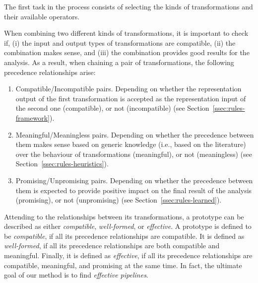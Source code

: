 The first task in the process consists of selecting the kinds of transformations and their available operators. 

When combining two different kinds of transformations, it is important to check if, (i) the input and output types of transformations are compatible, (ii) the combination makes sense, and (iii) the combination provides good results for the analysis. As a result, when chaining a pair of transformations, the following precedence relationships arise:

\begin{enumerate}
    \item Compatible/Incompatible pairs. Depending on whether the representation output of the first transformation is accepted as the representation input of the second one (compatible), or not (incompatible) (see Section~\ref{ssec:rules-framework}).
    \item Meaningful/Meaningless pairs. Depending on whether the precedence between them makes sense based on generic knowledge (i.e., based on the literature) over the behaviour of transformations (meaningful), or not (meaningless) (see Section~\ref{ssec:rules-heuristics}). 
    \item Promising/Unpromising pairs. Depending on whether the precedence between them is expected to provide positive impact on the final result of the analysis (promising), or not (unpromising) (see Section~\ref{ssec:rules-learned}). 
\end{enumerate}

Attending to the relationships between its transformations, a prototype can be described as either \textit{compatible}, \textit{well-formed}, or \textit{effective}. A prototype is defined to be \textit{compatible}, if all its precedence relationships are compatible. It is defined as \textit{well-formed}, if all its precedence relationships are both compatible and meaningful. Finally, it is defined as \textit{effective}, if all its precedence relationships are compatible, meaningful, and promising at the same time. In fact, the ultimate goal of our method is to find \textit{effective pipelines}.

